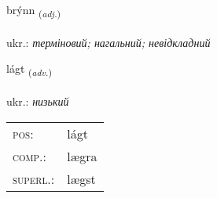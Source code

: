 \documentclass[frontgrid, backgrid]{flacards}\usepackage[]{graphicx}\usepackage[]{xcolor}
\begin{document}
\renewcommand{\blhead}{\vskip5pt {\small\bfseries\footnotesize Lýsingarorð | прикметник }}
\renewcommand{\bcfoot}{\vskip5pt \hspace{2pt}{\small\bfseries\footnotesize 2K}}


{brýnn \small{\textsubscript{(\textit{adj.})}} \\[1ex] %
\textphonetic{[pritn̥]} \\
ukr.: \emph{терміновий; нагальний; невідкладний} \\  [2ex]
\renewcommand*{\arraystretch}{0.8}
}

\renewcommand{\flhead}{\vskip5pt \fboxsep=0pt {\small\bfseries\footnotesize Atviksorð | прислівник}}
\renewcommand{\fcfoot}{\vskip5pt \fboxsep=0pt \hspace{2pt}{\small\bfseries\footnotesize 2K}}

\renewcommand{\blhead}{\vskip5pt {\small\bfseries\footnotesize Atviksorð | прислівник }}
\renewcommand{\bcfoot}{\vskip5pt \hspace{2pt}{\small\bfseries\footnotesize 2K}}


{lágt \small{\textsubscript{(\textit{adv.})}} \\[1ex] %
\textphonetic{[lauxt]} \\
ukr.: \emph{низький} \\  [2ex]
\renewcommand*{\arraystretch}{0.8}
\begin{tabular}{ll}
\textsc{pos}: & lágt \\ 
\textsc{comp.}: & lægra \\ 
\textsc{superl.}: & lægst \\
\end{tabular}
}
\end{document}

